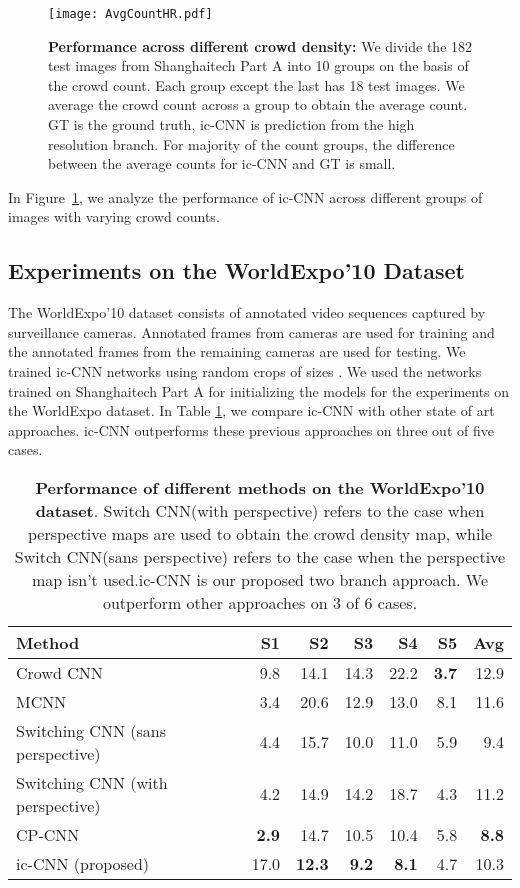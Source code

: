 \documentclass[runningheads]{llncs}
\begin{document}
\begin{figure}[!thb]
\centering
\texttt{[image: AvgCountHR.pdf]}

	\caption{\textbf{Performance across different crowd density:} We divide the 182 test images from Shanghaitech Part A into 10 groups on the basis of the crowd count. Each group except the last has 18 test images. We average the crowd count across a group to obtain the average count. GT is the ground truth, ic-CNN is prediction from the high resolution branch. For majority of the count groups, the difference between the average counts for ic-CNN and GT is small.\label{fig:avgcount}}	
\end{figure}
In Figure~\ref{fig:avgcount}, we analyze the performance of ic-CNN across different groups of images with varying crowd counts.
\subsection{Experiments on the WorldExpo'10 Dataset} 
The WorldExpo'10 dataset consists of  annotated video sequences captured by  surveillance cameras. Annotated frames from  cameras are used for training and the annotated frames from the remaining  cameras are used for testing. We trained ic-CNN networks using random crops of sizes . We used the networks trained on Shanghaitech Part A for initializing the models for the experiments on the WorldExpo dataset. In Table \ref{tab:worldexpo10}, we compare ic-CNN with other state of art approaches. ic-CNN outperforms these previous approaches on three out of five cases. 


\setlength{\tabcolsep}{7pt}
\begin{table}[!tbp]
\centering
\caption{{\bf Performance of different methods on the WorldExpo'10 dataset}.  Switch CNN(with perspective) refers to the case when perspective maps are used to obtain the crowd density map, while Switch CNN(sans perspective) refers to the case when the perspective map isn't used.ic-CNN is our proposed two branch approach. We outperform other approaches on 3 of 6 cases. \label{tab:worldexpo10}}
\begin{tabular}{lrrrrrr}
\toprule 
Method                         & S1 & S2 & S3 & S4 & S5 & Avg \\
\midrule
Crowd CNN~\cite{zhang2015cross}                   &  9.8  & 14.1   &  14.3  & 22.2   & \textbf{3.7}   &  12.9   \\
MCNN  ~\cite{zhang2016single}                         &  3.4  &  20.6  &  12.9  & 13.0   & 8.1   &   11.6  \\
Switching CNN (sans perspective)~\cite{sam2017switching}  &  4.4  &  15.7  & 10.0   & 11.0   & 5.9   & 9.4 \\
Switching CNN (with perspective)~\cite{sam2017switching} & 4.2   &   14.9 & 14.2   &  18.7  & 4.3   & 11.2 \\
CP-CNN\cite{sindagi2017generating} & \textbf{2.9 }& 14.7 &10.5
& 10.4 & 5.8 & \textbf{8.8 }\\
ic-CNN (proposed) & 17.0 & \textbf{12.3} &  \textbf{9.2}  & \textbf{8.1} & 4.7 & 10.3 \\
\bottomrule
\end{tabular}
\end{table}
 
\end{document}
